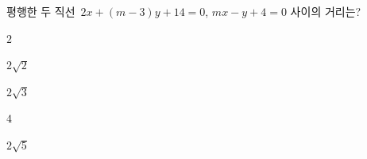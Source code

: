 평행한 두 직선~$2x+(m-3)y+14=0$, $mx-y+4=0$ 사이의 거리는? 
\begin{choices32}{\rule[-3ex]{0pt}{8ex}$2$}{\rule[-3ex]{0pt}{8ex}$2\sqrt{2}$}{\rule[-3ex]{0pt}{8ex}$2\sqrt{3}$}{\rule[-3ex]{0pt}{8ex}$4$}{\rule[-3ex]{0pt}{8ex}$2\sqrt{5}$}\end{choices32}
